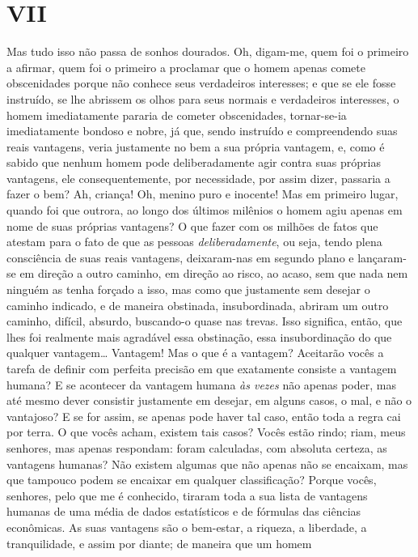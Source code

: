 \section{VII}

Mas tudo isso não passa de sonhos dourados. Oh, digam-me, quem foi o
primeiro a afirmar, quem foi o primeiro a proclamar que o homem apenas
comete obscenidades porque não conhece seus verdadeiros interesses; e
que se ele fosse instruído, se lhe abrissem os olhos para seus normais
e verdadeiros interesses, o homem imediatamente pararia de cometer
obscenidades, tornar-se-ia imediatamente bondoso e nobre, já que, sendo
instruído e compreendendo suas reais vantagens, veria justamente no bem
a sua própria vantagem, e, como é sabido que nenhum homem pode
deliberadamente agir contra suas próprias vantagens, ele
consequentemente, por necessidade, por assim dizer, passaria a fazer o
bem? Ah, criança! Oh, menino puro e inocente! Mas em primeiro lugar,
quando foi que outrora, ao longo dos últimos milênios o homem agiu
apenas em nome de suas próprias vantagens? O que fazer com os milhões
de fatos que atestam para o fato de que as pessoas
\textit{deliberadamente}, ou seja, tendo plena consciência de suas
reais vantagens, deixaram-nas em segundo plano e lançaram-se em direção
a outro caminho, em direção ao risco, ao acaso, sem que nada nem
ninguém as tenha forçado a isso, mas como que justamente sem desejar o
caminho indicado, e de maneira obstinada, insubordinada, abriram um
outro caminho, difícil, absurdo, buscando-o quase nas trevas. Isso
significa, então, que lhes foi realmente mais agradável essa
obstinação, essa insubordinação do que qualquer vantagem\ldots{} Vantagem!
Mas o que é a vantagem? Aceitarão vocês a tarefa de definir com
perfeita precisão em que exatamente consiste a vantagem humana? E se
acontecer da vantagem humana \textit{às vezes} não
apenas poder, mas até mesmo dever consistir justamente em desejar, em
alguns casos, o mal, e não o vantajoso? E se for assim, se apenas pode
haver tal caso, então toda a regra cai por terra. O que vocês acham,
existem tais casos? Vocês estão rindo; riam, meus senhores, mas apenas
respondam: foram calculadas, com absoluta certeza, as vantagens
humanas? Não existem algumas que não apenas não se encaixam, mas que
tampouco podem se encaixar em qualquer classificação? Porque vocês,
senhores, pelo que me é conhecido, tiraram toda a sua lista de
vantagens humanas de uma média de dados estatísticos e de fórmulas das
ciências econômicas. As suas vantagens são o bem-estar, a riqueza, a
liberdade, a tranquilidade, e assim por diante; de maneira que um homem
